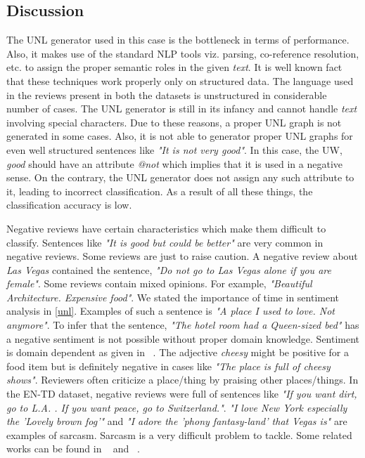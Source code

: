 \subsection*{Discussion}

The UNL generator used in this case is the bottleneck in terms of performance. Also, it makes use of the standard NLP tools viz. parsing, co-reference resolution, etc. 
to assign the proper semantic roles in the given \textit{text}. It is well known fact that these techniques work properly only on structured data. The language used in 
the reviews present in both the datasets is unstructured in considerable number of cases. The UNL generator is still in its infancy and cannot handle \textit{text} 
involving special characters. Due to these reasons, a proper UNL graph is not generated in some cases. Also, it is not able to generator proper UNL graphs for even well 
structured sentences like \textit{"It is not very good"}. In this case, the UW,  \textit{good} should have an attribute \textit{@not} which implies that it is used in 
a negative sense. On the contrary, the UNL generator does not assign any such attribute to it, leading to incorrect classification. As a result of all these things, the 
classification accuracy is low.

Negative reviews have certain characteristics which make them difficult to classify. Sentences like \textit{"It is good but could be better"} are very common in negative 
reviews. Some reviews are just to raise caution. A negative review about \textit{Las Vegas} contained the sentence, \textit{"Do not go to Las Vegas alone if you are female"}. 
Some reviews contain mixed opinions. For example, \textit{"Beautiful Architecture. Expensive food"}. We stated the importance of time in sentiment analysis in \cref{unl}. 
Examples of such a sentence is \textit{"A place I used to love. Not anymore"}. To infer that the sentence, \textit{"The hotel room had a Queen-sized bed"} has a negative 
sentiment is not possible without proper domain knowledge. Sentiment is domain dependent as given in ~\citep*{liu2010sentiment}. The adjective \textit{cheesy} might be positive for a 
food item but is definitely negative in cases like \textit{"The place is full of cheesy shows"}. Reviewers often criticize a place/thing by praising other places/things. In 
the EN-TD dataset, negative reviews were full of sentences like \textit{"If you want dirt, go to L.A. . If you want peace, go to Switzerland."}. \textit{"I love New York 
especially the 'Lovely brown fog'"} and \textit{"I adore the 'phony fantasy-land' that Vegas is"} are examples of sarcasm. Sarcasm is a very difficult problem to tackle. 
Some related works can be found in ~\citep*{carvalho2009clues} and ~\citep*{gonzalez2011identifying}.

